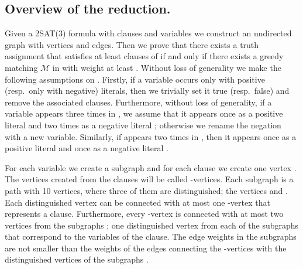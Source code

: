 \documentclass[a4paper,11pt]{article}
\newcommand{\mcal}{\ensuremath{\mathcal{M}}\xspace}
\begin{document}
\subsection{Overview of the reduction.\label{overview-subsec}}
Given a 2SAT(3) formula  with  clauses and  variables  we construct an undirected graph  with 
vertices and  edges. Then we prove that there exists a truth
assignment that satisfies at least  clauses of  if and only if
there exists a greedy matching \mcal in  with weight at
least . Without loss of generality we make the following assumptions
on . Firstly, if a variable occurs only with positive (resp.~only
with negative) literals, then we trivially set it true (resp.~false) and
remove the associated clauses. Furthermore, without loss of generality, if a
variable  appears three times in , we assume that it appears
once as a positive literal  and two times as a negative literal ; otherwise we rename the negation with a new variable.
Similarly, if  appears two times in , then it appears once as
a positive literal  and once as a negative literal .


For each variable  we create a subgraph 
and for each clause  we create one vertex . The vertices
created from the clauses will be called -vertices. Each subgraph  is a path with 10 vertices, where three of them
are distinguished; the vertices  and . Each distinguished vertex can be connected with at most one -vertex that represents a clause. Furthermore, every -vertex is connected
with at most two vertices from the subgraphs ;
one distinguished vertex from each of the subgraphs  that correspond to the variables of the clause. The edge weights
in the subgraphs  are not smaller than the
weights of the edges connecting the -vertices with the distinguished
vertices of the subgraphs . 
\end{document}
